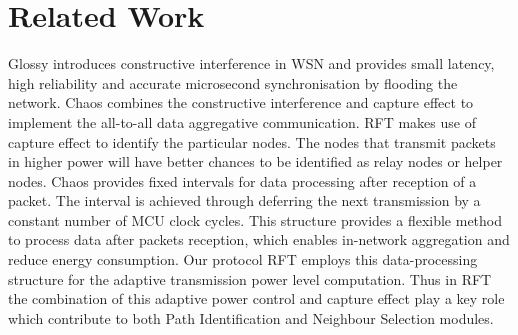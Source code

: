 \documentclass[conference]{IEEEtran}
\begin{document}
\section{Related Work}
\label{relatedwork}
Glossy \cite{ferrari2011efficient} introduces constructive interference in WSN and provides small latency, high reliability and accurate microsecond synchronisation by flooding the network. Chaos \cite{landsiedel2013chaos} combines the constructive interference and capture effect to implement the all-to-all data aggregative communication. RFT makes use of capture effect to identify the particular nodes. The nodes that transmit packets in higher power will have better chances to be identified as relay nodes or helper nodes.  Chaos provides fixed intervals for data processing after reception of a packet. The interval is achieved through deferring the next transmission by a constant number of MCU clock cycles. This structure provides a flexible method to process data after packets reception, which enables in-network aggregation and reduce energy consumption. Our protocol RFT employs this data-processing structure for the adaptive transmission power level computation. Thus in RFT the combination of this adaptive power control and capture effect play a key role which contribute to both Path Identification and Neighbour Selection modules. %
\end{document}
